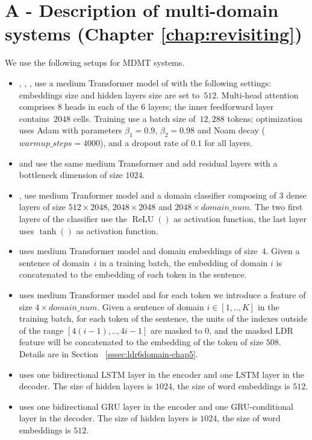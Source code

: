 \chapter{A - Description of multi-domain systems \label{ssec:implementation-details} (Chapter \ref{chap:revisiting})}
\label{appendix:a}
We use the following setups for MDMT systems.
\begin{itemize}
\item {}, , ,  use a medium Transformer model of \cite{Vaswani17attention} with the following settings: embeddings size and hidden layers size are set to~$512$. Multi-head attention comprises 8 heads in each of the 6 layers; the inner feedforward layer contains~$2048$ cells. 
Training use a batch size of~$12,288$ tokens; optimization uses Adam with parameters $\beta_1=0.9$, $\beta_2= 0.98$ and Noam decay ($warmup\_steps=4000$), and a dropout rate of $0.1$ for all layers.
\item {} and  use the same medium Transformer and add residual layers with a bottleneck dimension of size $1024$.
\item {},  use medium Tranformer model and a domain classifier composing of 3 dense layers of size $512 \times 2048$, $2048 \times 2048$ and $2048 \times domain\_num$. The two first layers of the classifier use the $\operatorname{ReLU}()$ as activation function, the last layer uses $\tanh()$ as activation function.
\item {} uses medium Transformer model and domain embeddings of size~$4$. Given a sentence of domain~$i$ in a training batch, the embedding of domain $i$ is concatenated to the embedding of each token in the sentence.
\item {} uses medium Transformer model and for each token we introduce a  feature of size $4 \times domain\_num$. Given a sentence of domain $i\in[1,..,K]$ in the training batch, for each token of the sentence, the  units of the indexes outside of the range $[4(i-1),..,4i-1]$ are masked to $0$, and the masked LDR feature will be concatenated to the embedding of the token of size $508$. Details are in Section ~\ref{sssec:ldr6domain-chap5}.
\item {} uses one bidirectional LSTM layer in the encoder and one LSTM layer in the decoder. The size of hidden layers is $1024$, the size of word embeddings is $512$. 
\item {} uses one bidirectional GRU layer in the encoder and one GRU-conditional layer in the decoder. The size of hidden layers is $1024$, the size of word embeddings is $512$.
\end{itemize}
